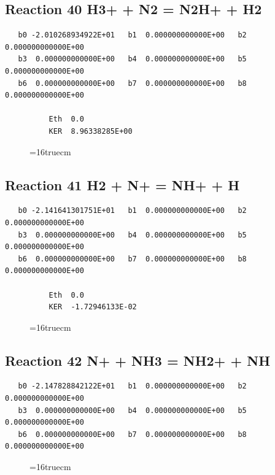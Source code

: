\documentclass[12pt,dvipdfm]{article}
\begin{document}
\subsection{
Reaction 40 H3+ + N2 = N2H+ + H2 }
\begin{small}\begin{verbatim}
   b0 -2.010268934922E+01   b1  0.000000000000E+00   b2  0.000000000000E+00
   b3  0.000000000000E+00   b4  0.000000000000E+00   b5  0.000000000000E+00
   b6  0.000000000000E+00   b7  0.000000000000E+00   b8  0.000000000000E+00

          Eth  0.0
          KER  8.96338285E+00
\end{verbatim}\end{small}
\begin{figure}[h!] \label{n2rates}
\epsfxsize=16truecm
\end{figure}
\newpage

\subsection{
Reaction 41 H2 + N+ = NH+ + H }
\begin{small}\begin{verbatim}
   b0 -2.141641301751E+01   b1  0.000000000000E+00   b2  0.000000000000E+00
   b3  0.000000000000E+00   b4  0.000000000000E+00   b5  0.000000000000E+00
   b6  0.000000000000E+00   b7  0.000000000000E+00   b8  0.000000000000E+00

          Eth  0.0
          KER  -1.72946133E-02
\end{verbatim}\end{small}
\begin{figure}[h!] \label{n2rates}
\epsfxsize=16truecm
\end{figure}
\newpage

\subsection{
Reaction 42 N+ + NH3 = NH2+ + NH }
\begin{small}\begin{verbatim}
   b0 -2.147828842122E+01   b1  0.000000000000E+00   b2  0.000000000000E+00
   b3  0.000000000000E+00   b4  0.000000000000E+00   b5  0.000000000000E+00
   b6  0.000000000000E+00   b7  0.000000000000E+00   b8  0.000000000000E+00
\end{verbatim}\end{small}
\begin{figure}[h!] \label{n2rates}
\epsfxsize=16truecm
\end{figure}
\newpage
\end{document}
